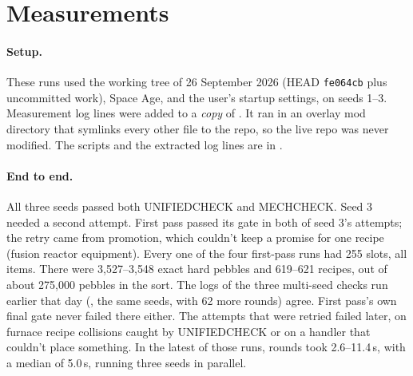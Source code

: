 \section{Measurements}
\label{sec:measure}

\paragraph{Setup.} These runs used the working tree of 26 September 2026 (HEAD \texttt{fe064cb} plus uncommitted work), Space Age, and the user's startup settings, on seeds 1--3. Measurement log lines were added to a \emph{copy} of . It ran in an overlay mod directory that symlinks every other file to the repo, so the live repo was never modified. The scripts and the extracted log lines are in .

\paragraph{End to end.} All three seeds passed both UNIFIEDCHECK and MECHCHECK. Seed 3 needed a second attempt. First pass passed its gate in both of seed 3's attempts; the retry came from promotion, which couldn't keep a promise for one recipe (fusion reactor equipment). Every one of the four first-pass runs had 255 slots, all items. There were 3{,}527--3{,}548 exact hard pebbles and 619--621 recipes, out of about 275{,}000 pebbles in the sort. The logs of the three multi-seed checks run earlier that day (, the same seeds, with 62 more rounds) agree. First pass's own final gate never failed there either. The attempts that were retried failed later, on furnace recipe collisions caught by UNIFIEDCHECK or on a handler that couldn't place something. In the latest of those runs, rounds took 2.6--11.4\,s, with a median of 5.0\,s, running three seeds in parallel.

\begin{table}[H]
\centering\scriptsize
\setlength{\tabcolsep}{2.2pt}

\caption{Every measured round. \emph{travs}/\emph{needs}: identities with needs, and how many needs they have. \emph{launch}: slots that require a launchable identity. \emph{pinned}: identities with no admissible slot but their own. \emph{adm.\ slots}: the mean number of other admissible slots, for identities with needs and for free ones. \emph{moved}: identities not at their vanilla position, and identities that changed slot this round. \emph{moved earlier}: of the identities that changed slot, how many got an earlier first pebble. The shift is the mean change in first-pebble rank as a fraction of the sort's length (negative is earlier). \emph{ores}: resource slots that mine something new. \emph{ref.}: refinements. Every exact hard pebble was proven in every round.}
\label{tab:rounds}
\end{table}

